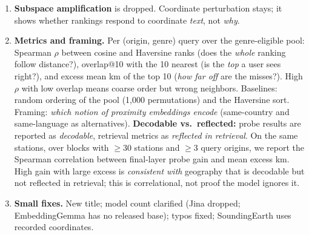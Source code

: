 \documentclass[10pt]{article}
\begin{document}
\begin{enumerate}[label=\textbf{\arabic*.}]
\item \textbf{Subspace amplification} is dropped. Coordinate perturbation stays; it shows whether rankings respond to coordinate \emph{text}, not \emph{why}.
\item \textbf{Metrics and framing.} Per (origin, genre) query over the genre-eligible pool: Spearman $\rho$ between cosine and Haversine ranks (does the \emph{whole} ranking follow distance?), overlap@10 with the 10 nearest (is the \emph{top} a user sees right?), and excess mean km of the top 10 (\emph{how far off} are the misses?). High $\rho$ with low overlap means coarse order but wrong neighbors. Baselines: random ordering of the pool (1,000 permutations) and the Haversine sort. Framing: \emph{which notion of proximity embeddings encode} (same-country and same-language as alternatives). \textbf{Decodable vs.\ reflected:} probe results are reported as \emph{decodable}, retrieval metrics as \emph{reflected in retrieval}. On the same stations, over blocks with $\ge$30 stations and $\ge$3 query origins, we report the Spearman correlation between final-layer probe gain and mean excess km. High gain with large excess is \emph{consistent with} geography that is decodable but not reflected in retrieval; this is correlational, not proof the model ignores it.
\item \textbf{Small fixes.} New title; model count clarified (Jina dropped; EmbeddingGemma has no released base); typos fixed; SoundingEarth uses recorded coordinates.
\end{enumerate}
\end{document}
